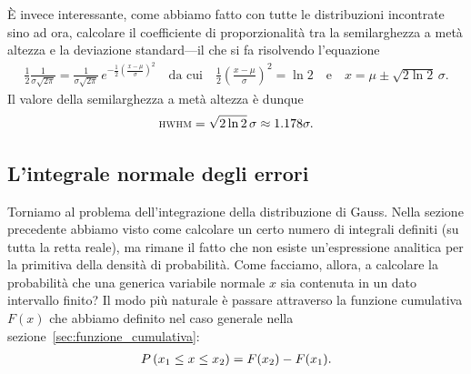 \`E invece interessante, come abbiamo fatto con tutte le distribuzioni
incontrate sino ad ora, calcolare il coefficiente di proporzionalità tra la
semilarghezza a metà altezza e la deviazione standard---il che si fa
risolvendo l'equazione
\begin{align*}
  \frac{1}{2} \frac{1}{\sigma\sqrt{2\pi}} =
  \frac{1}{\sigma\sqrt{2\pi}} \, e^{-\frac{1}{2}\left(\frac{x-\mu}{\sigma}\right)^2}
  \quad \text{da cui} \quad
  \frac{1}{2}\left(\frac{x-\mu}{\sigma}\right)^2 = \ln 2
  \quad \text{e} \quad
  x = \mu \pm \sqrt{2\ln 2} \, \sigma.
\end{align*}
Il valore della semilarghezza a metà altezza è dunque
\begin{align}
  {\scriptstyle \textsc{HWHM}} = \sqrt{2\ln 2}\, \sigma \approx 1.178 \sigma.
\end{align}


\subsection{L'integrale normale degli errori}

Torniamo al problema dell'integrazione della distribuzione di Gauss. Nella
sezione precedente abbiamo visto come calcolare un certo numero di integrali
definiti (su tutta la retta reale), ma rimane il fatto che non esiste
un'espressione analitica per la primitiva della densità di probabilità. Come
facciamo, allora, a calcolare la probabilità che una generica variabile
normale $x$ sia contenuta in un dato intervallo finito? Il modo più naturale
è passare attraverso la funzione cumulativa $F(x)$ che abbiamo definito
nel caso generale nella sezione~\ref{sec:funzione_cumulativa}:
\begin{align*}
  \displaystyle P\left(x_1 \leq x \leq x_2\right) = F(x_2) - F(x_1).
\end{align*}


